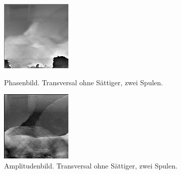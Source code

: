 \documentclass[
    11pt,
    ngerman
]{scrbook}
\begin{document}
\begin{figure}[htbp]
    \begin{minipage}[htbp]{.45\textwidth}
        \centering
        \includegraphics[width=.9\textwidth]{Abbildungen/2015-03-13_3_1.png}
        \caption{Phasenbild. Transversal ohne Sättiger, zwei Spulen.}
        \label{fig:2015-03-13_3_1}
    \end{minipage}
    \hfill
    \begin{minipage}[htbp]{.45\textwidth}
        \centering
        \includegraphics[width=.9\textwidth]{Abbildungen/2015-03-13_2_1.png}
        \caption{Amplitudenbild. Transversal ohne Sättiger, zwei Spulen.}
        \label{fig:2015-03-13_2_1}
    \end{minipage}
\end{figure}
\end{document}
